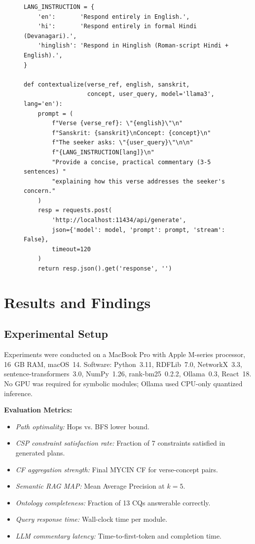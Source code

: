 \documentclass[conference]{IEEEtran}
\begin{document}
\begin{figure}[!t]
\begin{lstlisting}[language=Python3, caption={Ollama contextual commentary generation}]
LANG_INSTRUCTION = {
    'en':       'Respond entirely in English.',
    'hi':       'Respond entirely in formal Hindi (Devanagari).',
    'hinglish': 'Respond in Hinglish (Roman-script Hindi + English).',
}

def contextualize(verse_ref, english, sanskrit,
                  concept, user_query, model='llama3', lang='en'):
    prompt = (
        f"Verse {verse_ref}: \"{english}\"\n"
        f"Sanskrit: {sanskrit}\nConcept: {concept}\n"
        f"The seeker asks: \"{user_query}\"\n\n"
        f"{LANG_INSTRUCTION[lang]}\n"
        "Provide a concise, practical commentary (3-5 sentences) "
        "explaining how this verse addresses the seeker's concern."
    )
    resp = requests.post(
        'http://localhost:11434/api/generate',
        json={'model': model, 'prompt': prompt, 'stream': False},
        timeout=120
    )
    return resp.json().get('response', '')
\end{lstlisting}
\end{figure}

\clearpage
\section{Results and Findings}

\subsection{Experimental Setup}

Experiments were conducted on a MacBook Pro with Apple M-series processor,
16~GB RAM, macOS~14. Software: Python~3.11, RDFLib~7.0, NetworkX~3.3,
sentence-transformers~3.0, NumPy~1.26, rank-bm25~0.2.2, Ollama~0.3, React~18. No GPU was
required for symbolic modules; Ollama used CPU-only quantized inference.

\textbf{Evaluation Metrics:}
\begin{itemize}[leftmargin=*]
  \item \textit{Path optimality:} Hops vs. BFS lower bound.
  \item \textit{CSP constraint satisfaction rate:} Fraction of 7 constraints
        satisfied in generated plans.
  \item \textit{CF aggregation strength:} Final MYCIN CF for verse-concept pairs.
  \item \textit{Semantic RAG MAP:} Mean Average Precision at $k = 5$.
  \item \textit{Ontology completeness:} Fraction of 13 CQs answerable correctly.
  \item \textit{Query response time:} Wall-clock time per module.
  \item \textit{LLM commentary latency:} Time-to-first-token and completion time.
\end{itemize}
\end{document}
